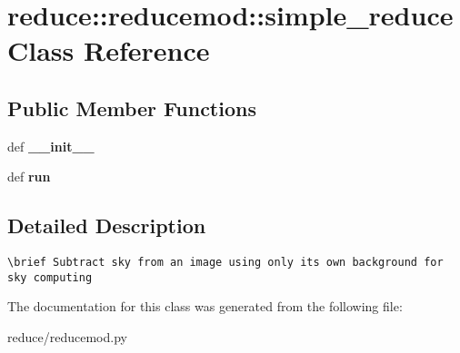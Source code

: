 \section{reduce::reducemod::simple\_\-reduce Class Reference}
\label{classreduce_1_1reducemod_1_1simple__reduce}
\subsection*{Public Member Functions}
\begin{CompactItemize}
\item 
def \textbf{\_\-\_\-init\_\-\_\-}\label{classreduce_1_1reducemod_1_1simple__reduce_8e9715811c626c33a4115bb005961229}

\item 
def \textbf{run}\label{classreduce_1_1reducemod_1_1simple__reduce_8fafbf4ee9238b20a9067fd37bd9766b}

\end{CompactItemize}


\subsection{Detailed Description}


\footnotesize\begin{verbatim}
\brief Subtract sky from an image using only its own background for sky computing
\end{verbatim}
\normalsize
 



The documentation for this class was generated from the following file:\begin{CompactItemize}
\item 
reduce/reducemod.py\end{CompactItemize}
